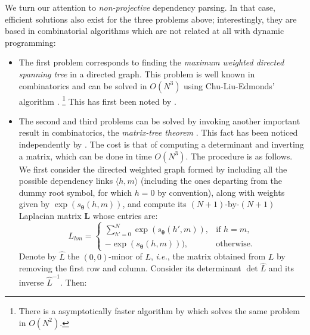 We turn our attention to \emph{non-projective} dependency parsing. In that case, efficient solutions also exist for the three problems above; 
interestingly, they are based in combinatorial algorithms which are not related at all with dynamic programming: 
\begin{itemize}
\item The first problem corresponds to finding the \emph{maximum weighted directed spanning tree} in a directed graph. 
This problem is well known in combinatorics and can be solved in $O(N^3)$ using Chu-Liu-Edmonds' algorithm 
\citep{Chu1965,Edmonds1967}.%
\footnote{There is a asymptotically faster algorithm by \citet{Tarjan1977} which solves the same problem in $O(N^2)$.} %
This has first been noted by \citet{McDonald2005b}. 
\item The second and third problems can be solved by invoking another important result in combinatorics, the 
\emph{matrix-tree theorem} \citep{Tutte1984}. This fact has been noticed independently by 
\citet{DSmithSmith2007,Koo2007,McDonald2007}. The cost is that of computing a determinant and inverting a matrix, 
which can be done in time $O(N^3)$. 
The procedure is as follows. 
We first consider the directed weighted graph formed by including all 
the possible dependency links $\langle h,m \rangle$ (including the ones departing from the dummy root symbol, 
for which $h = 0$ by convention), along with weights 
given by $\exp(s_{\boldsymbol{\theta}}(h,m))$, 
and compute its 
$(N+1)$-by-$(N+1)$ Laplacian matrix $\boldsymbol{L}$ whose entries are:
\begin{equation}
L_{hm} = \left\{ 
\begin{array}{ll}
\sum_{h'=0}^N\exp(s_{\boldsymbol{\theta}}(h',m)), & \text{if $h=m$,} \\
-\exp(s_{\boldsymbol{\theta}}(h,m))), & \text{otherwise.}
\end{array}\right.
\end{equation}
Denote by $\hat{L}$ the $(0,0)$-minor of $L$, 
\emph{i.e.}, the matrix obtained from $L$ 
by removing the first row and column. Consider its determinant $\det \hat{L}$ and its 
inverse $\hat{L}^{-1}$. %
Then: %

\end{itemize}

